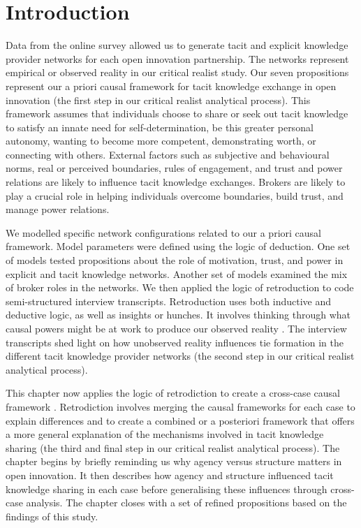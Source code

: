 \section{Introduction} 

Data from the online survey allowed us to generate tacit and explicit knowledge provider networks for each open innovation partnership. The networks represent empirical or observed reality in our critical realist study. Our seven propositions represent our a priori causal framework for tacit knowledge exchange in open innovation (the first step in our critical realist analytical process). This framework assumes that individuals choose to share or seek out tacit knowledge to satisfy an innate need for self-determination, be this greater personal autonomy, wanting to become more competent, demonstrating worth, or connecting with others. External factors such as subjective and behavioural norms, real or perceived boundaries, rules of engagement, and trust and power relations are likely to influence tacit knowledge exchanges. Brokers are likely to play a crucial role in helping individuals overcome boundaries, build trust, and manage power relations. \medskip

We modelled specific network configurations related to our a priori causal framework. Model parameters were defined using the logic of deduction. One set of models tested propositions about the role of motivation, trust, and power in explicit and tacit knowledge networks. Another set of models examined the mix of broker roles in the networks. We then applied the logic of retroduction to code semi-structured interview transcripts. Retroduction uses both inductive and deductive logic, as well as insights or hunches. It involves thinking through what causal powers might be at work to produce our observed reality \citep{jagosh2020retroductive}. The interview transcripts shed light on how unobserved reality influences tie formation in the different tacit knowledge provider networks (the second step in our critical realist analytical process). \medskip

This chapter now applies the logic of retrodiction to create a cross-case causal framework \citep{welch2011theorising,mcavoy2018critical}. Retrodiction involves merging the causal frameworks for each case to explain differences and to create a combined or a posteriori framework that offers a more general explanation of the mechanisms involved in tacit knowledge sharing (the third and final step in our critical realist analytical process). The chapter begins by briefly reminding us why agency versus structure matters in open innovation. It then describes how agency and structure influenced tacit knowledge sharing in each case before generalising these influences through cross-case analysis. The chapter closes with a set of refined propositions based on the findings of this study.

